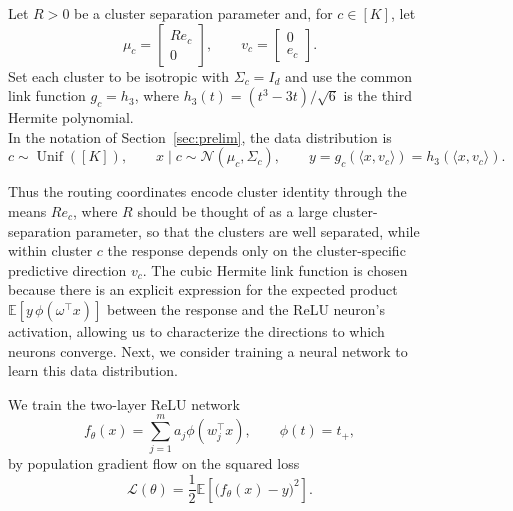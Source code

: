 \documentclass{article}
\newcounter{setting}[section]
\newcounter{initialization}[section]
\newcounter{datasetting}
\newcounter{trainingsetup}
\newcounter{initializationsetting}
\begin{document}
\begin{figure}
\begin{datasetting}
\label{data:neuron-specialization}

Let $R > 0$ be a cluster separation parameter and, for $c\in[K]$, let
\[
    \mu_c=
    \begin{bmatrix}
        Re_c\\
        0
    \end{bmatrix},
    \qquad
    v_c=
    \begin{bmatrix}
        0\\
        e_c
    \end{bmatrix}.
\]
Set each cluster to be isotropic with $\Sigma_c=I_d$ and use the common link function $g_c=h_3$, where $h_3(t)=(t^3-3t)/\sqrt6$ is the third Hermite polynomial.
\\

In the notation of Section~\ref{sec:prelim}, the data distribution is
\[
    c\sim\operatorname{Unif}([K]),
    \qquad
    x\mid c\sim\mathcal N(\mu_c,\Sigma_c),
    \qquad
    y=g_c\!\left(\langle x,v_c\rangle\right)
      =h_3\!\left(\langle x,v_c\rangle\right).
\]
\end{datasetting}

Thus the routing coordinates encode cluster identity through the means
$Re_c$, where $R$ should be thought of as a large cluster-separation
parameter, so that the clusters are well separated, while within cluster $c$ the response depends only on the
cluster-specific predictive direction $v_c$. The cubic Hermite link function is chosen because there is an explicit expression for the expected product $\mathbb{E}[y\,\phi(\omega^\top x)]$ between the response and the ReLU neuron's activation, allowing us to characterize the directions to which neurons converge.
Next, we consider training a neural network to learn this data distribution.

\begin{trainingsetup}
\label{train:neuron-specialization}
We train the two-layer ReLU network
\[
    f_\theta(x)=\sum_{j=1}^m a_j\phi(w_j^\top x),
    \qquad
    \phi(t)=t_+,
\]
by population gradient flow on the squared loss
\[
    \mathcal L(\theta)
    =
    \frac12\mathbb E\left[
        \bigl(f_\theta(x)-y\bigr)^2
    \right].
\]
\end{trainingsetup}


\begin{initializationsetting}
\label{init:neuron-specialization}


\end{initializationsetting}
\end{figure}
\end{document}
